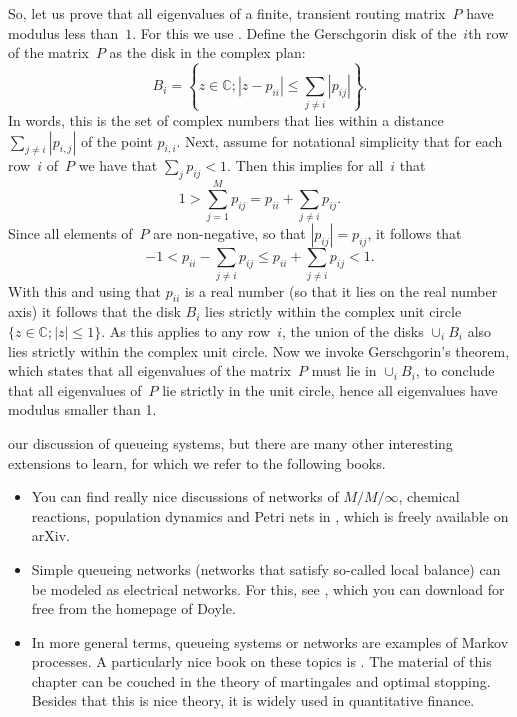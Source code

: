 \documentclass[stochastic-or.tex]{subfiles}
\begin{document}
So, let us prove that all eigenvalues of a finite, transient routing matrix~$P$ have modulus less than~$1$.
For this we use .
Define the Gerschgorin disk of the~$i$th row of the matrix~$P$ as the disk in the complex plan:
\begin{equation*}
B_i=\left\{z\in \mathbb{C};  |z-p_{ii}|\leq \sum_{j\neq i} |p_{i j}| \right\}.
\end{equation*}
In words, this is the set of complex numbers that lies within a distance $\sum_{j\neq i} |p_{i,j}|$ of the point $p_{i,i}$.
Next, assume for notational simplicity that for each row~$i$ of~$P$ we have that $\sum_{j} p_{i j}<1$.
Then this implies for all~$i$ that
\begin{equation*}
1> \sum_{j=1}^M p_{i j} =  p_{ii} + \sum_{j\neq i} p_{i j}.
\end{equation*}
Since all elements of~$P$ are non-negative, so that $|p_{i j}| = p_{i j }$, it follows that
\begin{equation*}
-1 < p_{ii} - \sum_{j\neq i} p_{i j} \leq p_{ii} + \sum_{j\neq i} p_{i j} < 1.
\end{equation*}
With this and using that $p_{ii}$ is a real number (so that it lies on the real number axis) it follows that the disk $B_i $ lies strictly within the complex unit circle $\{z \in \mathbb{C}; |z|\leq 1\}$.
As this applies to any row~$i$, the union of the disks $\cup_{i} B_{i}$ also lies strictly within the complex unit circle.
Now we invoke Gerschgorin's theorem, which states that all eigenvalues of the matrix~$P$ must lie in $\cup_i B_i$, to conclude that all eigenvalues of~$P$ lie strictly in the unit circle, hence all eigenvalues have modulus smaller than 1.


 our discussion of queueing systems, but there are many other interesting extensions to learn, for which we refer to the following books.
\begin{itemize}
\item You can find really nice discussions of networks of $M/M/\infty$, chemical reactions, population dynamics and Petri nets in \cite{baez2012quantum}, which is freely available on arXiv.
\item Simple queueing networks (networks that satisfy so-called local balance) can be modeled as electrical networks.
  For this, see \cite{doyle84:_random_walks_elect_networ}, which you can download for free from the homepage of Doyle.
\item In more general terms, queueing systems or networks are examples of Markov processes.
  A particularly nice book on these topics is \cite{norris97:_markov_chain}.
  The material of this chapter can be couched in the theory of martingales and optimal stopping.
  Besides that this is nice theory, it is widely used in quantitative finance.
\end{itemize}
\end{document}
